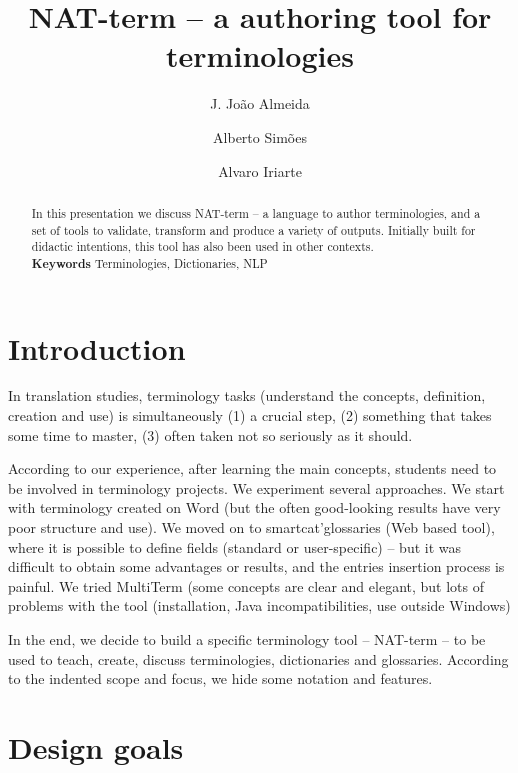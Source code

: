 \documentclass[english,a4paper,12pt]{article}
\begin{document}
\title{NAT-term -- a authoring tool for terminologies}
\author{J. João Almeida \and Alberto Simões \and Alvaro Iriarte}
\date{}
\maketitle
\begin{abstract}
In this presentation we discuss NAT-term -- a language to author terminologies,
and a set of tools to validate, transform and produce a variety of outputs.
Initially built for didactic intentions, this tool has also been used in other contexts. 
\\ \textbf{Keywords} Terminologies, Dictionaries, NLP
\end{abstract}


\section{Introduction}
In translation studies, 
terminology tasks (understand the concepts, definition, creation and use) is simultaneously 
(1) a crucial step, (2) something that takes some time to master, (3) often taken 
not so seriously as it should.

According to our experience, after learning the main concepts, 
students need to be involved in terminology projects. 
We experiment several approaches.
  We start with terminology created on Word (but the
  often good-looking results have very poor structure and use).
  We moved on to smartcat'glossaries\cite{smartcatgloss} (Web based tool),
  where it is possible to define fields (standard or user-specific) -- but it was
  difficult to obtain some advantages or results, and the entries insertion process is painful.
  We tried MultiTerm\cite{multiterm} (some concepts are clear and elegant, but lots of problems
     with the tool (installation, Java incompatibilities, use outside Windows)

In the end, we decide to build a specific terminology tool -- NAT-term -- 
to be used to teach, create, discuss terminologies, dictionaries and glossaries.
According to the indented scope and focus, we hide some notation and features.

\section{Design goals}
\end{document}
